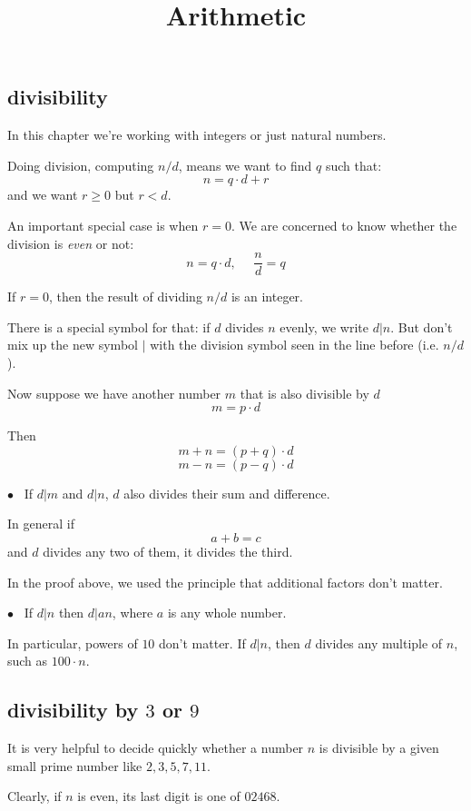 \documentclass[11pt, oneside]{article}
\title{Arithmetic}
\date{}
\begin{document}
\maketitle
\Large


\subsection*{divisibility}

In this chapter we're working with integers or just natural numbers.

Doing division, computing $n/d$, means we want to find $q$ such that:
\[ n = q \cdot d + r \]
and we want $r \ge 0$ but $r < d$.

An important special case is when $r = 0$.  We are concerned to know whether the division is \emph{even} or not:
\[ n = q \cdot d, \ \ \ \ \ \ \frac{n}{d} = q \]

If $r = 0$, then the result of dividing $n/d$ is an integer.

There is a special symbol for that:  if $d$ divides $n$ evenly, we write $d|n$.  But don't mix up the new symbol $|$ with the division symbol seen in the line before (i.e. $n/d$).

Now suppose we have another number $m$ that is also divisible by $d$
\[ m = p \cdot d \]

Then 
\[ m + n = (p + q) \cdot d \]
\[ m - n = (p - q) \cdot d \]

$\bullet$ \ If $d|m$ and $d|n$, $d$ also divides their sum and difference.

In general if
\[ a + b = c \]
and $d$ divides any two of them, it divides the third.

In the proof above, we used the principle that additional factors don't matter.

$\bullet$ \ If $d|n$ then $d|an$, where $a$ is any whole number.

In particular, powers of $10$ don't matter.  If $d|n$, then $d$ divides any multiple of $n$, such as $100 \cdot n$.

\subsection*{divisibility by $3$ or $9$}

It is very helpful to decide quickly whether a number $n$ is divisible by a given small prime number like $2, 3, 5, 7, 11$.

Clearly, if $n$ is even, its last digit is one of $02468$.
\end{document}
